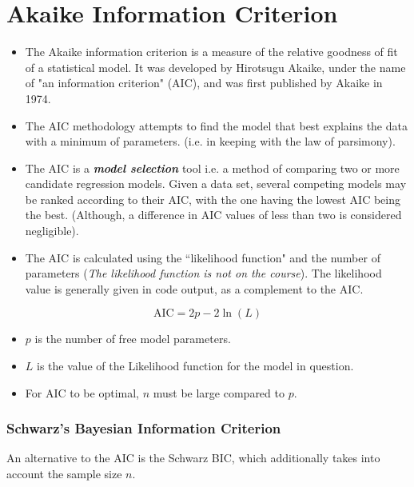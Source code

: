 \documentclass[a4paper,12pt]{article}
\begin{document}
\section*{Akaike Information Criterion}
\begin{itemize}
	\item The Akaike information criterion is a measure of the relative goodness of fit of a statistical model. It was developed by Hirotsugu Akaike, under the name of "an information criterion" (AIC), and was first published by Akaike in 1974.
	\item 
	The AIC methodology attempts to find the model that best explains the data with a minimum of parameters. (i.e. in keeping with the law of parsimony).
	\item The AIC is a \textbf{\textit{model selection}} tool i.e. a method of comparing two
	or more candidate regression models. Given a data set, several competing models may be ranked according to their AIC, with the one having the lowest AIC being the best. (Although, a difference in AIC values of less than two is considered negligible).
	\item	
	The AIC is calculated using the ``likelihood function" and the number of parameters (\textit{The likelihood function is not on the course}). The likelihood value is generally given in code output, as a complement to the AIC.
\end{itemize}




\[\mbox{AIC} = 2p - 2\ln(L)\]

\begin{itemize}
	\item $p$ is the number of free model parameters.
	\item $L$ is the value of the Likelihood function for the model in question.
	\item For AIC to be optimal, $n$ must be large compared to $p$.\\
\end{itemize}
\subsubsection*{Schwarz's Bayesian Information Criterion}
An alternative to the AIC is the Schwarz BIC, which additionally takes into account the sample size $n$.
\end{document}
